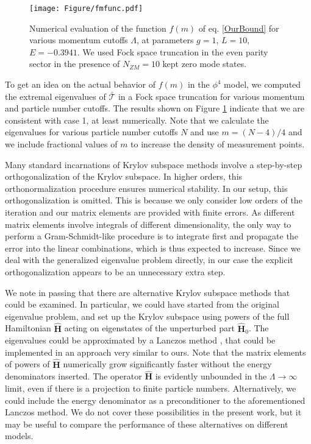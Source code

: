 \documentclass[twocolumn,secnumarabic,amssymb, nobibnotes, aps, prd]{revtex4-2}
\begin{document}
\begin{figure}[h]
    \centering
     \texttt{[image: Figure/fmfunc.pdf]}

    \caption{Numerical evaluation of the function $f(m)$ of eq. \eqref{OurBound} for various momentum cutoffs $\Lambda$, at parameters $g=1$, $L=10$, $E=-0.3941$. We used Fock space truncation in the even parity sector in the presence of $N_{ZM}=10$ kept zero mode states. }
    \label{fmfunc}
\end{figure}
To get an idea on the actual behavior of $f(m)$ in the $\phi^4$ model, we computed the extremal eigenvalues of $\bar{\boldsymbol{\mathcal{T}}}$ in a Fock space truncation for various momentum and particle number cutoffs. The results shown on Figure \ref{fmfunc} indicate that we are consistent with case 1, at least numerically. Note that we calculate the eigenvalues for various particle number cutoffs $N$ and use $m=(N-4)/4$ and we include fractional values of $m$ to increase the density of measurement points. 

 Many standard incarnations of Krylov subspace methods involve a step-by-step orthogonalization of the Krylov subspace. In higher orders, this orthonormalization procedure ensures numerical stability. In our setup, this orthogonalization is omitted. This is because we only consider low orders of the iteration and our matrix elements are provided with finite errors. As different matrix elements involve integrals of different dimensionality, the only way to perform a Gram-Schmidt-like procedure is to integrate first and propagate the error into the linear combinations, which is thus expected to increase. Since we deal with the generalized eigenvalue problem directly, in our case the explicit orthogonalization appears to be an unnecessary extra step.

We note in passing that there are alternative Krylov subspace methods that could be examined. In particular, we could have started from the original eigenvalue problem, and set up the Krylov subspace using powers of the full Hamiltonian $\hat{\mathbf H}$ acting on eigenstates of the unperturbed part $\hat{\mathbf H}_{0}$. The eigenvalues could be approximated by a Lanczos method \cite{Lanczos:1950zz,Ojalvo:1970aa,Paige:1972aa}, that could be implemented in an approach very similar to ours. Note that the matrix elements of powers of $\hat{\mathbf H}$ numerically grow significantly faster without the energy denominators inserted. The operator $\hat{\mathbf{H}}$ is evidently unbounded in the $\Lambda\rightarrow\infty$ limit, even if there is a projection to finite particle numbers.
Alternatively, we could include the energy denominator as a preconditioner to the aforementioned Lanczos method. We do not cover these possibilities in the present work, but it may be useful to compare the performance of these alternatives on different models. 
\end{document}
